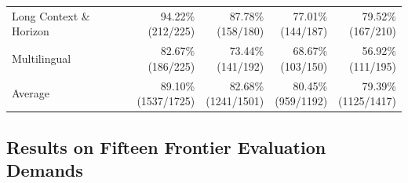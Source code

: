 \documentclass{article} %
\begin{document}
\begin{table}[htbp]
{\begin{tabular}{@{}lrrrr@{}}
			Long Context \& Horizon & \shortstack{94.22\%\\(212/225)} & \shortstack{87.78\%\\(158/180)} & \shortstack{77.01\%\\(144/187)} & \shortstack{79.52\%\\(167/210)} \\
			Multilingual & \shortstack{82.67\%\\(186/225)} & \shortstack{73.44\%\\(141/192)} & \shortstack{68.67\%\\(103/150)} & \shortstack{56.92\%\\(111/195)} \\
			Average & \shortstack{89.10\%\\(1537/1725)} & \shortstack{82.68\%\\(1241/1501)} & \shortstack{80.45\%\\(959/1192)} & \shortstack{79.39\%\\(1125/1417)} \\
			\bottomrule
		\end{tabular}%
		}
	\end{table}

	\subsection{Results on Fifteen Frontier Evaluation Demands}
\end{document}
